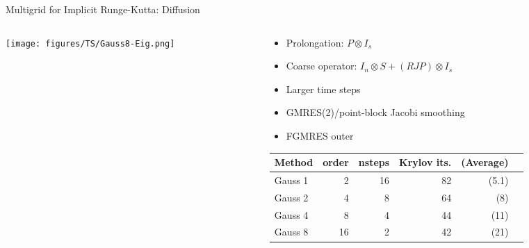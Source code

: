 \documentclass{beamer}
\begin{document}
\begin{frame}{Multigrid for Implicit Runge-Kutta: Diffusion}
  \begin{columns}
    \begin{column}{0.3\textwidth}
      \texttt{[image: figures/TS/Gauss8-Eig.png]}
    \end{column}
    \begin{column}{0.7\textwidth}
      \begin{itemize}
      \item Prolongation: $P \otimes I_s$
      \item Coarse operator: $I_n \otimes S + (R J P) \otimes I_s$
      \item Larger time steps
      \item GMRES(2)/point-block Jacobi smoothing
      \item FGMRES outer
      \end{itemize}
      \begin{tabular}{lrrrrr}
        \toprule
        Method & order & nsteps & Krylov its. & (Average) \\
        \midrule
        Gauss 1 & 2 & 16 & 82 & (5.1) \\
        Gauss 2 & 4 & 8 & 64 & (8) \\
        Gauss 4 & 8 & 4 & 44 & (11) \\
        Gauss 8 & 16 & 2 & 42 & (21) \\
        \bottomrule
      \end{tabular}
    \end{column}
  \end{columns}
\end{frame}



% 
\end{document}
